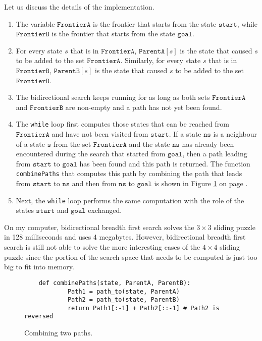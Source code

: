 Let us discuss the details of the implementation.
\begin{enumerate}
\item The variable $\texttt{FrontierA}$ is the frontier that starts from the state $\texttt{start}$, while
      $\texttt{FrontierB}$ is the frontier that starts from the state $\texttt{goal}$.
\item For every state $s$ that is in $\texttt{FrontierA}$, $\mathtt{ParentA}[s]$ is the state that caused $s$
      to be added to the set $\texttt{FrontierA}$.  Similarly, for every state $s$ that is in $\texttt{FrontierB}$,
      $\mathtt{ParentB}[s]$ is the state that caused $s$ to be added to the set $\texttt{FrontierB}$.
\item The bidirectional search keeps running for as long as both sets $\texttt{FrontierA}$ and
      $\texttt{FrontierB}$ are non-empty and a path has not yet been found.
\item The \texttt{while} loop first computes those states that can be reached from $\texttt{FrontierA}$ and have not been
      visited from $\texttt{start}$.  If a state $\texttt{ns}$ is a neighbour of a state $\texttt{s}$ from the set
      $\texttt{FrontierA}$ and the state $\texttt{ns}$ has already been encountered during the search that started
      from $\texttt{goal}$, then a path leading from $\texttt{start}$ to $\texttt{goal}$ has been found and this path
      is returned.  The function \texttt{combinePaths} that computes this path by combining the path that leads
      from $\texttt{start}$ to $\texttt{ns}$ and then from $\texttt{ns}$ to $\texttt{goal}$ is shown in Figure
      \ref{fig:combine-paths.stlx} on page \pageref{fig:combine-paths.stlx}.
\item Next, the \texttt{while} loop performs the same computation with the role of the states $\texttt{start}$
      and $\texttt{goal}$ exchanged. 
\end{enumerate}
On my computer, bidirectional breadth first search solves the $3 \times 3$ sliding puzzle in 128
milliseconds and uses 4 megabytes.  However, bidirectional breadth first search is still not able to solve the
more interesting cases of the $4 \times 4$ sliding puzzle since the portion of the search space that needs to
be computed is just too big to fit into memory. 

\begin{figure}[!ht]
\centering
\begin{verbatim}
    def combinePaths(state, ParentA, ParentB):
            Path1 = path_to(state, ParentA)
            Path2 = path_to(state, ParentB)
            return Path1[:-1] + Path2[::-1] # Path2 is reversed
\end{verbatim}
\vspace*{-0.3cm}
\caption{Combining two paths.}
\label{fig:combine-paths.stlx}
\end{figure}

